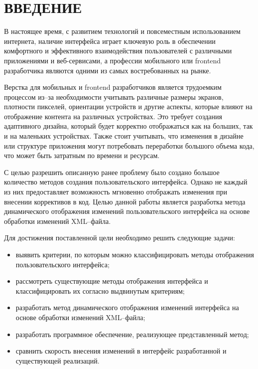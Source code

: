 \section*{ВВЕДЕНИЕ}

В настоящее время, с развитием технологий и повсеместным использованием интернета, наличие интерфейса играет ключевую роль в обеспечении комфортного и эффективного взаимодействия пользователей с различными приложениями и веб-сервисами, а профессии мобильного или frontend разработчика являются одними из самых востребованных на рынке. 

Верстка для мобильных и frontend разработчиков является трудоемким процессом из--за необходимости учитывать различные размеры экранов, плотности пикселей, ориентации устройств и другие аспекты, которые влияют на отображение контента на различных устройствах. 
Это требует создания адаптивного дизайна, который будет корректно отображаться как на больших, так и на маленьких устройствах. 
Также стоит учитывать, что изменения в дизайне или структуре приложения могут потребовать переработки большого объема кода, что может быть затратным по времени и ресурсам. 

С целью разрешить описанную ранее проблему было создано большое количество методов создания пользовательского интерфейса. 
Однако не каждый из них предоставляет возможность мгновенно отображать изменения при внесении коррективов в код. 
Целью данной работы является разработка метода динамического отображения изменений пользовательского интерфейса на основе обработки изменений XML--файла.

Для достижения поставленной цели необходимо решить следующие задачи:

\begin{itemize}[label=---]
	\item выявить критерии, по которым можно классифицировать методы отображения пользовательского интерфейса;
	\item рассмотреть существующие методы отображения интерфейса и классифицировать их согласно выдвинутым критериям;
	\item разработать метод динамического отображения изменений интерфейса на основе обработки изменений XML--файла;
	\item разработать программное обеспечение, реализующее представленный метод;
	\item сравнить скорость внесения изменений в интерфейс разработанной и существующей реализаций.
\end{itemize}

\pagebreak
